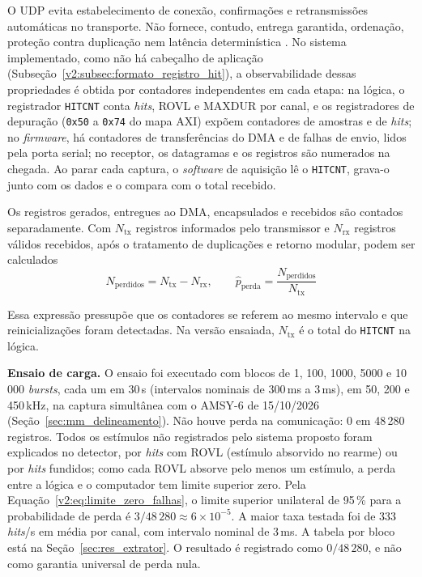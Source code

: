 O UDP evita estabelecimento de conexão, confirmações e retransmissões automáticas no transporte. Não fornece, contudo, entrega garantida, ordenação, proteção contra duplicação nem latência determinística \cite{postel1980udp}. No sistema implementado, como não há cabeçalho de aplicação (Subseção~\ref{v2:subsec:formato_registro_hit}), a observabilidade dessas propriedades é obtida por contadores independentes em cada etapa: na lógica, o registrador \texttt{HITCNT} conta \textit{hits}, ROVL e MAXDUR por canal, e os registradores de depuração (\texttt{0x50} a \texttt{0x74} do mapa AXI) expõem contadores de amostras e de \textit{hits}; no \textit{firmware}, há contadores de transferências do DMA e de falhas de envio, lidos pela porta serial; no receptor, os datagramas e os registros são numerados na chegada. Ao parar cada captura, o \textit{software} de aquisição lê o \texttt{HITCNT}, grava-o junto com os dados e o compara com o total recebido.

Os registros gerados, entregues ao DMA, encapsulados e recebidos são contados separadamente. Com \(N_{\mathrm{tx}}\) registros informados pelo transmissor e \(N_{\mathrm{rx}}\) registros válidos recebidos, após o tratamento de duplicações e retorno modular, podem ser calculados
\begin{equation}
	N_{\mathrm{perdidos}} = N_{\mathrm{tx}}-N_{\mathrm{rx}}, \qquad \widehat{p}_{\mathrm{perda}} = \frac{N_{\mathrm{perdidos}}}{N_{\mathrm{tx}}}
	\label{v2:eq:taxa_perda_udp}
\end{equation}

Essa expressão pressupõe que os contadores se referem ao mesmo intervalo e que reinicializações foram detectadas. Na versão ensaiada, \(N_{\mathrm{tx}}\) é o total do \texttt{HITCNT} na lógica.

\textbf{Ensaio de carga.} O ensaio foi executado com blocos de 1, 100, 1000, 5000 e 10\,000 \textit{bursts}, cada um em 30\,s (intervalos nominais de 300\,ms a 3\,ms), em 50, 200 e 450\,kHz, na captura simultânea com o AMSY-6 de 15/10/2026 (Seção~\ref{sec:mm_delineamento}). Não houve perda na comunicação: 0 em 48\,280 registros. Todos os estímulos não registrados pelo sistema proposto foram explicados no detector, por \textit{hits} com ROVL (estímulo absorvido no rearme) ou por \textit{hits} fundidos; como cada ROVL absorve pelo menos um estímulo, a perda entre a lógica e o computador tem limite superior zero. Pela Equação~\eqref{v2:eq:limite_zero_falhas}, o limite superior unilateral de 95\,\% para a probabilidade de perda é \(3/48\,280 \approx 6\times10^{-5}\). A maior taxa testada foi de 333 \textit{hits}/s em média por canal, com intervalo nominal de 3\,ms. A tabela por bloco está na Seção~\ref{sec:res_extrator}. O resultado é registrado como \(0/48\,280\), e não como garantia universal de perda nula.

